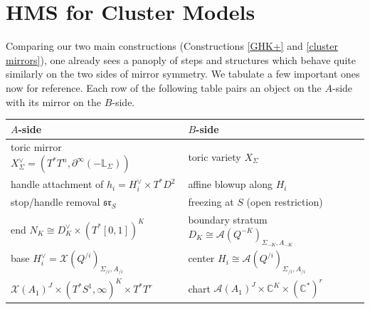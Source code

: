 \documentclass[11pt]{amsart}
\theoremstyle{definition}
\newtheorem{exmp}[thm]{Example}
\theoremstyle{remark}
\renewcommand{\emptyset}{\varnothing}
\numberwithin{equation}{section}
\begin{document}
\section{HMS for Cluster Models}




Comparing our two main constructions (Constructions \ref{GHK+} and \ref{cluster mirrors}), one already sees a panoply of steps and structures which behave quite similarly on the two sides of mirror symmetry. We tabulate a few important ones now for reference. Each row of the following table pairs an object on the $A$-side with its mirror on the $B$-side.\\
\begin{table}[ht]
\centering
\renewcommand{\arraystretch}{1.3}
\begin{tabular}{ll}
\hline
$A$-side & $B$-side \\
\hline
toric mirror $X_\Sigma^\vee=(T^*T^n,\partial^\infty(-\mathbb{L}_\Sigma))$ & toric variety $X_\Sigma$ \\
handle attachment of $h_i=H_i^\vee\times T^*D^2$ & affine blowup along $H_i$ \\
stop/handle removal $\mathfrak{sr}_S$ & freezing at $S$ (open restriction) \\
end $N_K\cong D_K^\vee\times(T^*[0,1])^K$ & boundary stratum $D_K\cong\mathcal{A}(Q^{-K})_{\Sigma_{-K},A_{-K}}$ \\
base $H_i^\vee=\mathcal{X}(Q^{/i})_{\Sigma_{/i},A_{/i}}$ & center $H_i\cong\mathcal{A}(Q^{/i})_{\Sigma_{/i},A_{/i}}$ \\
$\mathcal{X}(A_1)^J\times(T^*S^1,\infty)^K\times T^*T^r$ & chart $\mathcal{A}(A_1)^J\times\mathbb{C}^K\times(\mathbb{C}^*)^r$ \\
\hline
\end{tabular}
\end{table}
\end{document}
